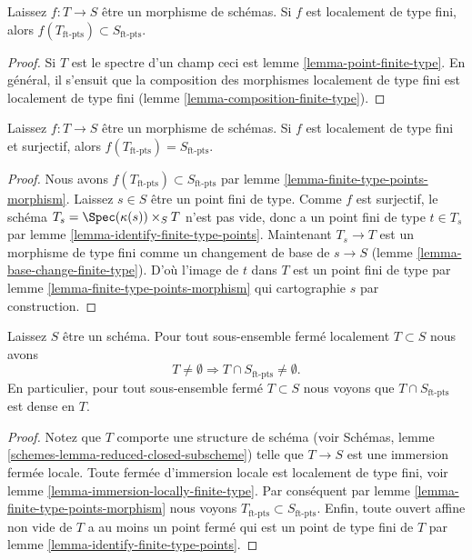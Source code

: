 \begin{lemma}

\label{lemma-finite-type-points-morphism}
Laissez $f : T \to S$ être un morphisme de schémas. Si $f$ est localement de type fini, alors $f(T_{\text{ft-pts}}) \subset S_{\text{ft-pts}}$.
\end{lemma}

\begin{proof}

Si $T$ est le spectre d'un champ ceci est lemme \ref{lemma-point-finite-type}. En général, il s'ensuit que la composition des morphismes localement de type fini est localement de type fini (lemme \ref{lemma-composition-finite-type}).

\end{proof}

\begin{lemma}

\label{lemma-finite-type-points-surjective-morphism}
Laissez $f : T \to S$ être un morphisme de schémas. Si $f$ est localement de type fini et surjectif, alors $f(T_{\text{ft-pts}}) = S_{\text{ft-pts}}$.
\end{lemma}

\begin{proof}
Nous avons $f(T_{\text{ft-pts}}) \subset S_{\text{ft-pts}}$ par lemme \ref{lemma-finite-type-points-morphism}. Laissez $s \in S$ être un point fini de type. Comme $f$ est surjectif, le schéma $T_s = \Spec(\kappa(s)) \times_S T$ n'est pas vide, donc a un point fini de type $t \in T_s$ par lemme \ref{lemma-identify-finite-type-points}. Maintenant $T_s \to T$ est un morphisme de type fini comme un changement de base de $s \to S$ (lemme \ref{lemma-base-change-finite-type}). D'où l'image de $t$ dans $T$ est un point fini de type par lemme \ref{lemma-finite-type-points-morphism} qui cartographie $s$ par construction.
\end{proof}

\begin{lemma}

\label{lemma-enough-finite-type-points}
Laissez $S$ être un schéma. Pour tout sous-ensemble fermé localement $T \subset S$ nous avons $$
T \not = \emptyset
\Rightarrow
T \cap S_{\text{ft-pts}} \not = \emptyset.
$$ En particulier, pour tout sous-ensemble fermé $T \subset S$ nous voyons que $T \cap S_{\text{ft-pts}}$ est dense en $T$.
\end{lemma}

\begin{proof}
Notez que $T$ comporte une structure de schéma (voir Schémas, lemme \ref{schemes-lemma-reduced-closed-subscheme}) telle que $T \to S$ est une immersion fermée locale. Toute fermée d'immersion locale est localement de type fini, voir lemme \ref{lemma-immersion-locally-finite-type}. Par conséquent par lemme \ref{lemma-finite-type-points-morphism} nous voyons $T_{\text{ft-pts}} \subset S_{\text{ft-pts}}$. Enfin, toute ouvert affine non vide de $T$ a au moins un point fermé qui est un point de type fini de $T$ par lemme \ref{lemma-identify-finite-type-points}.
\end{proof}

